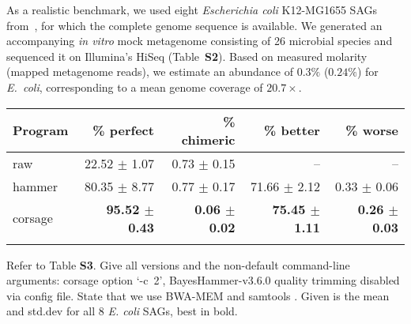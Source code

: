 \documentclass{bioinfo}
\begin{document}
As a realistic benchmark, we used eight \textit{Escherichia coli} K12-MG1655 SAGs from~\citealp{scott2}, for which the complete genome sequence is available.
We generated an accompanying \emph{in vitro} mock metagenome consisting of 26 microbial species and sequenced it on Illumina's HiSeq (Table~\textbf{S2}). %
Based on measured molarity (mapped metagenome reads), we estimate an abundance of $0.3\%$ ($0.24\%$) for \textit{E.~coli}, corresponding to a mean genome coverage of $20.7\times$. %

\begin{table}[t]
{\footnotesize
\begin{tabular}{lrrrr}
\toprule
Program  & \% perfect            & \% chimeric               & \% better             & \% worse \\
\midrule
raw      & 22.52 $\pm$ 1.07      & 0.73 $\pm$ 0.15           & --                    & -- \\
hammer   & 80.35 $\pm$ 8.77      & 0.77 $\pm$ 0.17           & 71.66 $\pm$ 2.12      & 0.33 $\pm$ 0.06 \\
corsage  & \textbf{95.52 $\pm$ 0.43}      & \textbf{0.06 $\pm$ 0.02}           & \textbf{75.45 $\pm$ 1.11}      & \textbf{0.26 $\pm$ 0.03} \\
\botrule
\end{tabular}}{Refer to Table \textbf{S3}. %
Give all versions and the non-default command-line arguments: corsage option `\mbox{-c 2}', BayesHammer-v3.6.0 quality trimming disabled via config file.
State that we use BWA-MEM \citep{bwamem} and samtools \citep{samtools}.
Given is the mean and std.dev for all 8 \textit{E. coli} SAGs, best in bold.
}
\end{table}
\end{document}
